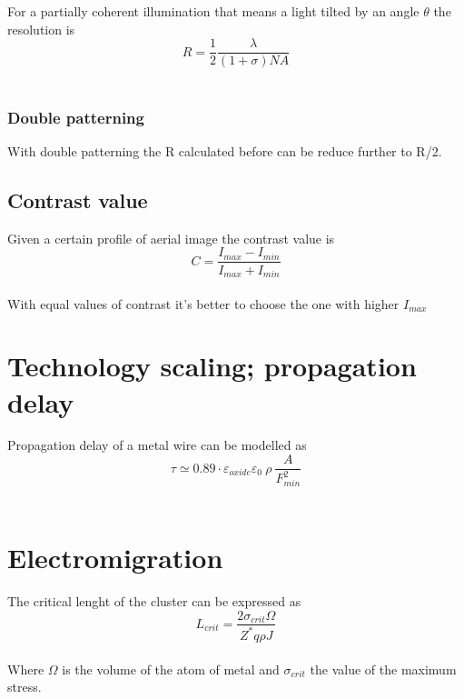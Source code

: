 For a partially coherent illumination that means a light tilted by an angle $\theta$ the resolution is
\begin{equation}
R=\frac{1}{2}\frac{\lambda}{(1+\sigma)NA}
\end{equation}
\\

\subsubsection{Double patterning}
With double patterning the R calculated before can be reduce further to R/2.\\



\subsection{Contrast value}
Given a certain profile of aerial image the contrast value is 
\begin{equation}
C=\frac{I_{max}-I_{min}}{I_{max}+I_{min}}
\end{equation}
\\
With equal values of contrast it's better to choose the one with higher $I_{max}$





\section{Technology scaling; propagation delay}
Propagation delay of a metal wire can be modelled as
\begin{equation}
\tau\simeq 0.89 \cdot \varepsilon_{oxide}\varepsilon_0 \ \rho \  \frac{A}{F_{min}^2} 
\end{equation}
\\


\section{Electromigration}
The critical lenght of the cluster can be expressed as 
\begin{equation}
L_{crit}=\frac{2\sigma_{crit}\Omega}{Z^*q\rho J}
\end{equation}
\\
Where $\Omega$ is the volume of the atom of metal and $\sigma_{crit}$ the value of the maximum stress.\\

